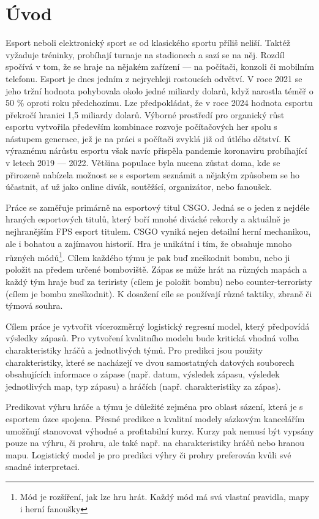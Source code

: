 \chapter{Úvod}
Esport neboli elektronický sport se od klasického sportu příliš neliší. Taktéž vyžaduje tréninky, probíhají turnaje na stadionech a sazí se na něj. Rozdíl spočívá v tom, že
se hraje na nějakém zařízení --- na počítači, konzoli či mobilním telefonu. Esport je dnes jedním z nejrychleji rostoucích odvětví. V roce 2021 se jeho tržní hodnota pohybovala
okolo jedné miliardy dolarů, když narostla téměř o 50 \% oproti roku předchozímu. Lze předpokládat, že v roce 2024 hodnota esportu překročí hranici 1,5 miliardy dolarů. Výborné
prostředí pro organický růst esportu vytvořila především kombinace rozvoje počítačových her spolu s nástupem generace, jež je na práci s počítači zvyklá již od útlého dětství.
K výraznému nárůstu esportu však navíc přispěla pandemie koronaviru probíhající v letech 2019 --- 2022. Většina populace byla nucena zůstat doma, kde se přirozeně nabízela možnost
se s esportem seznámit a nějakým způsobem se ho účastnit, ať už jako online divák, soutěžící, organizátor, nebo fanoušek.

Práce se zaměřuje primárně na esportový titul \acf{CSGO}. Jedná se o jeden z nejdéle hraných esportových titulů, který boří mnohé divácké rekordy a aktuálně je nejhranějším
\ac{FPS} esport titulem. \ac{CSGO} vyniká nejen detailní herní mechanikou, ale i bohatou a zajímavou historií. Hra je unikátní i tím, že obsahuje mnoho různých
módů\footnote{Mód je rozšíření, jak lze hru hrát. Každý mód má svá vlastní pravidla, mapy i herní fanoušky}. Cílem každého týmu je pak buď zneškodnit bombu, nebo ji položit na
předem určené bomboviště. Zápas se může hrát na různých mapách a každý tým hraje buď za teriristy (cílem je položit bombu) nebo counter-terroristy (cílem je bombu zneškodnit).
K dosažení cíle se používají různé taktiky, zbraně či týmová souhra.

Cílem práce je vytvořit vícerozměrný logistický regresní model, který předpovídá výsledky zápasů. Pro vytvoření kvalitního modelu bude kritická vhodná volba
charakteristiky hráčů a jednotlivých týmů. Pro predikci jsou použity charakteristiky, které se nacházejí ve dvou samostatných datových
souborech obsahujících informace o zápase (např. datum, výsledek zápasu, výsledek jednotlivých map, typ zápasu) a hráčích (např. charakteristiky za zápas). 

Predikovat výhru hráče a týmu je důležité zejména pro oblast sázení, která je s esportem úzce spojena. Přesné predikce a kvalitní modely sázkovým kancelářím umožňují
stanovovat výhodné a profitabilní kurzy. Kurzy pak nemusí být vypsány pouze na výhru, či prohru, ale také např. na charakteristiky hráčů nebo hranou mapu. Logistický model je pro
predikci výhry či prohry preferován kvůli své snadné interpretaci.

